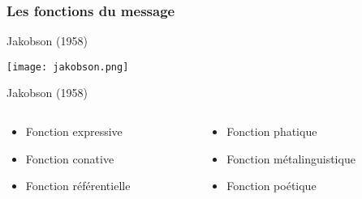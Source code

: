 \begin{frame}
	\frametitle{Les fonctions du message}
	\begin{block}{Jakobson (1958)}
		\begin{center}
		\texttt{[image: jakobson.png]}
		\end{center}
	\end{block} \pause
	
	\begin{block}{Jakobson (1958)}
		\begin{columns}
			\begin{column}{.5\textwidth}
				\begin{itemize}
					\item{Fonction expressive} \pause
					\item{Fonction conative} \pause
					\item{Fonction référentielle} \pause
				\end{itemize}
			\end{column}
			\begin{column}{.5\textwidth}
				\begin{itemize}
					\item{Fonction phatique} \pause
					\item{Fonction métalinguistique} \pause
					\item{Fonction poétique}
				\end{itemize}
			\end{column}
		\end{columns}
	\end{block}
\end{frame}
